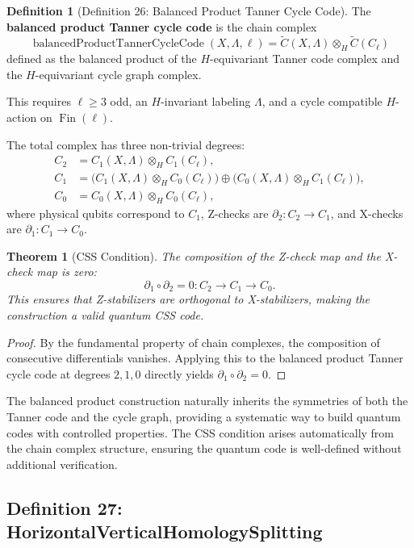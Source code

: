 \documentclass[11pt]{article}
\theoremstyle{plain}
\newtheorem*{theorem}{Theorem}
\theoremstyle{definition}
\newtheorem*{definition}{Definition}
\theoremstyle{remark}
\begin{document}
\begin{definition}[Definition 26: Balanced Product Tanner Cycle Code]
The \textbf{balanced product Tanner cycle code} is the chain complex
\[
\operatorname{balancedProductTannerCycleCode}(X, \Lambda, \ell) = \widetilde{C}(X,\Lambda) \otimes_H \widetilde{C}(C_\ell)
\]
defined as the balanced product of the $H$-equivariant Tanner code complex and the $H$-equivariant cycle graph complex.

This requires $\ell \geq 3$ odd, an $H$-invariant labeling $\Lambda$, and a cycle compatible $H$-action on $\operatorname{Fin}(\ell)$.

The total complex has three non-trivial degrees:
\begin{align*}
  C_2 &= C_1(X,\Lambda) \otimes_H C_1(C_\ell), \\
  C_1 &= \bigl(C_1(X,\Lambda) \otimes_H C_0(C_\ell)\bigr) \oplus \bigl(C_0(X,\Lambda) \otimes_H C_1(C_\ell)\bigr), \\
  C_0 &= C_0(X,\Lambda) \otimes_H C_0(C_\ell),
\end{align*}
where physical qubits correspond to $C_1$, Z-checks are $\partial_2 : C_2 \to C_1$, and X-checks are $\partial_1 : C_1 \to C_0$.
\end{definition}

\begin{theorem}[CSS Condition]
The composition of the Z-check map and the X-check map is zero:
\[
\partial_1 \circ \partial_2 = 0 : C_2 \to C_1 \to C_0.
\]
This ensures that Z-stabilizers are orthogonal to X-stabilizers, making the construction a valid quantum CSS code.
\end{theorem}

\begin{proof}
By the fundamental property of chain complexes, the composition of consecutive differentials vanishes. Applying this to the balanced product Tanner cycle code at degrees $2, 1, 0$ directly yields $\partial_1 \circ \partial_2 = 0$.
\end{proof}

The balanced product construction naturally inherits the symmetries of both the Tanner code and the cycle graph, providing a systematic way to build quantum codes with controlled properties. The CSS condition arises automatically from the chain complex structure, ensuring the quantum code is well-defined without additional verification.

\vspace{1em}

\subsection{Definition 27: HorizontalVerticalHomologySplitting}
\end{document}
